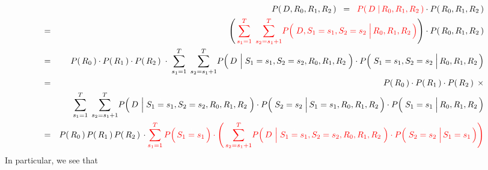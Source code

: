 \begin{eqnarray*}
&&
	P\!\left(\,D,R_{0},R_{1},R_{2}\,\right)
\;\; = \;\;
	{\color{red}P\!\left(\,D \;\vert\,R_{0},R_{1},R_{2}\,\right)}
	\cdot
	P\!\left(\,R_{0},R_{1},R_{2}\,\right)
\\
& = &
	\left(\,
		{\color{red}
		\overset{T}{\underset{s_{1}=1}{\sum}}\;\,
		\overset{T}{\underset{s_{2}=s_{1}+1}{\sum}}
		P\!\left(\,\left.D,S_{1}\overset{{\color{white}1}}{=}s_{1},S_{2}=s_{2} \;\right\vert R_{0},R_{1},R_{2}\,\right)
		}
		\right)
	\cdot
	P\!\left(\,R_{0},R_{1},R_{2}\,\right)
\\
& = &
	P\!\left(\,R_{0}\,\right)
	\cdot
	P\!\left(\,R_{1}\,\right)
	\cdot
	P\!\left(\,R_{2}\,\right)
	\;\cdot\;
	\overset{T}{\underset{s_{1}=1}{\sum}}\;\,
	\overset{T}{\underset{s_{2}=s_{1}+1}{\sum}}
	P\!\left(\,D\,\left\vert\; S_{1}\overset{{\color{white}1}}{=}s_{1},S_{2}=s_{2},R_{0},R_{1},R_{2}\right.\,\right)
	\cdot
	P\!\left(\,\left.S_{1}\overset{{\color{white}1}}{=}s_{1},S_{2}=s_{2} \;\right\vert R_{0},R_{1},R_{2}\,\right)
\\
& = &
	P\!\left(\,R_{0}\,\right)
	\cdot
	P\!\left(\,R_{1}\,\right)
	\cdot
	P\!\left(\,R_{2}\,\right)
	\;\times
\\
&&
	\overset{T}{\underset{s_{1}=1}{\sum}}\;\,
	\overset{T}{\underset{s_{2}=s_{1}+1}{\sum}}
	P\!\left(\,D\,\left\vert\;S_{1}\overset{{\color{white}1}}{=}s_{1},S_{2}=s_{2},R_{0},R_{1},R_{2}\right.\,\right)
	\cdot
	P\!\left(\,\left.S_{2}\overset{{\color{white}1}}{=}s_{2}\;\right\vert S_{1}=s_{1},R_{0},R_{1},R_{2}\,\right)
	\cdot
	P\!\left(\,\left.S_{1}\overset{{\color{white}1}}{=}s_{1} \;\right\vert R_{0},R_{1},R_{2}\,\right)
\\
& = &
	P\!\left(\,R_{0}\,\right) P\!\left(\,R_{1}\,\right) P\!\left(\,R_{2}\,\right)
	\,\cdot
	{\color{red}
		\overset{T}{\underset{s_{1}=1}{\sum}}\,
		P\!\left(\,S_{1}\overset{{\color{white}1}}{=}s_{1}\,\right)
		\cdot
		\left(\,
			\overset{T}{\underset{s_{2}=s_{1}+1}{\sum}}
			P\!\left(\,D\,\left\vert\;S_{1}\overset{{\color{white}1}}{=}s_{1},S_{2}=s_{2},R_{0},R_{1},R_{2}\right.\,\right)
			\cdot
			P\!\left(\,\left.S_{2}\overset{{\color{white}1}}{=}s_{2}\;\right\vert S_{1}=s_{1}\,\right)
			\right)
		}
\end{eqnarray*}
In particular, we see that
